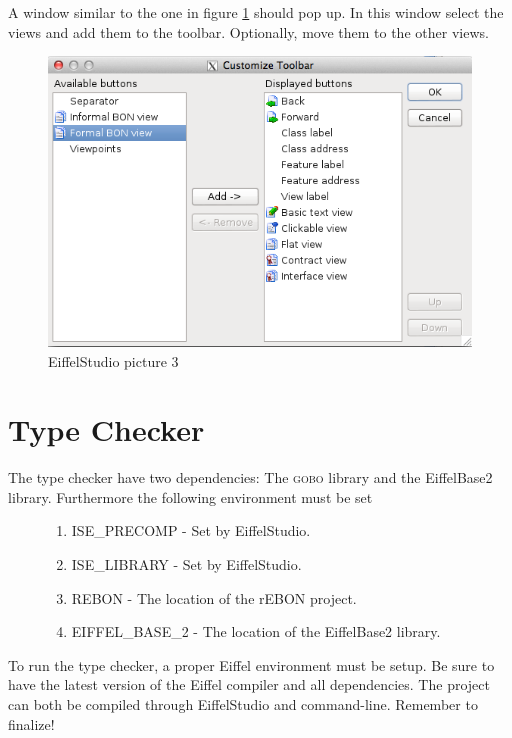 A window similar to the one in figure \ref{fig:EiffelStudio3} should pop up. In this window select the \bon{} views and add them to the toolbar. Optionally, move them to the other views.

\begin{figure}[H]
\centering
\includegraphics[scale=0.8]{images/es3.png}
\caption{EiffelStudio picture 3}
\label{fig:EiffelStudio3}
\end{figure}

\section{Type Checker}

The type checker have two dependencies: The \textsc{gobo} library and the EiffelBase2 library. Furthermore the following environment must be set
\begin{figure}[H]
\begin{enumerate}
\item ISE\_PRECOMP - Set by EiffelStudio.
\item ISE\_LIBRARY - Set by EiffelStudio.
\item REBON - The location of the rEBON project.
\item EIFFEL\_BASE\_2 - The location of the EiffelBase2 library.
\end{enumerate}
\end{figure}
To run the type checker, a proper Eiffel environment must be setup. Be sure to have the latest version of the Eiffel compiler and all dependencies. The project can both be compiled through EiffelStudio and command-line. Remember to finalize!
